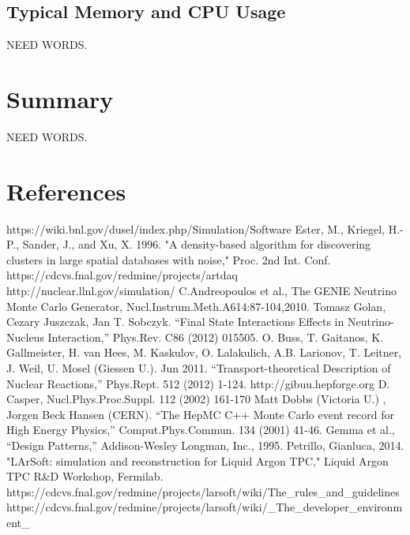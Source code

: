 \documentclass[12pt]{elsarticle}
\begin{document}
\subsection{Typical Memory and CPU Usage}
NEED WORDS.

\section{Summary}
NEED WORDS.
\section{References}

\begin{thebibliography}{99}
 https://wiki.bnl.gov/dusel/index.php/Simulation/Software
 Ester, M., Kriegel, H.-P., Sander, J., and Xu, X. 1996. "A density-based algorithm for discovering clusters in large spatial databases with noise," Proc. 2nd Int. Conf.
 https://cdcvs.fnal.gov/redmine/projects/artdaq
 http://nuclear.llnl.gov/simulation/
 C.Andreopoulos et al., The GENIE Neutrino Monte Carlo Generator, Nucl.Instrum.Meth.A614:87-104,2010.
 Tomasz Golan, Cezary Juszczak, Jan T. Sobczyk. ``Final State Interactions Effects in Neutrino-Nucleus Interaction,'' Phys.Rev. C86 (2012) 015505.
 O. Buss, T. Gaitanos, K. Gallmeister, H. van Hees, M. Kaskulov, O. Lalakulich, A.B. Larionov, T. Leitner, J. Weil, U. Mosel (Giessen U.). Jun 2011. ``Transport-theoretical Description of Nuclear Reactions,'' Phys.Rept. 512 (2012) 1-124. http://gibuu.hepforge.org
 D. Casper, Nucl.Phys.Proc.Suppl. 112 (2002) 161-170
 Matt Dobbs (Victoria U.) , Jorgen Beck Hansen (CERN). ``The HepMC C++ Monte Carlo event record for High Energy Physics,'' Comput.Phys.Commun. 134 (2001) 41-46.
 Gemma et al., ``Design Patterns,'' Addison-Wesley Longman, Inc., 1995. 
 Petrillo, Gianluca, 2014. "LArSoft: simulation and reconstruction for Liquid Argon TPC," Liquid Argon TPC R\&D Workshop, Fermilab.
 https://cdcvs.fnal.gov/redmine/projects/larsoft/wiki/The\_rules\_and\_guidelines
https://cdcvs.fnal.gov/redmine/projects/larsoft/wiki/\_The\_developer\_environment\_
\end{thebibliography}
\clearpage 
\end{document}
